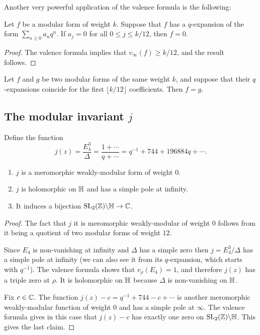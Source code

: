 Another very powerful application of the valence formula is the following:
\begin{theorem}
  Let $f$ be a modular form of weight $k$. Suppose that $f$ has a $q$-expansion of the form $\sum_{n\geq 0} a_nq^n$. If $a_j=0$ for all $0\leq j\leq k/12$, then $f=0$.
\end{theorem}
\begin{proof}
  The valence formula implies that $v_\infty(f)\geq k/12$, and the result follows.
\end{proof}
\begin{corollary}
  Let $f$ and $g$ be two modular forms of the same weight $k$, and suppose that their $q$-expansions coincide for the first $\lfloor k/12\rfloor$ coefficients. Then $f=g$.
\end{corollary}

\subsection{The modular invariant \texorpdfstring{$j$}{j}}
  Define the function
\[
j(z)=\frac{E_4^3}{\Delta} = \frac{1+\cdots}{q+\cdots} = q^{-1} + 744 + 196884 q + \cdots.
\]
\begin{proposition}
  \begin{enumerate}
  \item $j$ is a meromorphic weakly-modular form of weight $0$.
  \item $j$ is holomorphic on $\mathbb{H}$ and has a simple pole at infinity.
  \item It induces a bijection $\operatorname{SL}_2(\mathbb{Z})\backslash\mathbb{H}\to \mathbb{C}$.
  \end{enumerate}
\end{proposition}
\begin{proof}
The fact that $j$ it is meromorphic weakly-modular of weight $0$ follows from it being a quotient of two modular forms of weight $12$.

Since $E_4$ is non-vanishing at infinity and $\Delta$ has a simple zero then $j=E_4^3/\Delta$ has a simple pole at infinity (we can also see it from its $q$-expansion, which starts with $q^{-1}$). The valence formula shows that $v_\rho(E_4)=1$, and therefore $j(z)$ has a triple zero at $\rho$. It is holomorphic on $\mathbb{H}$ because $\Delta$ is non-vanishing on $\mathbb{H}$.

Fix $c\in\mathbb{C}$. The function $j(z)-c=q^{-1}+744-c+\cdots$ is another meromorphic weakly-modular function of weight $0$ and has a simple pole at $\infty$. The valence formula gives in this case that $j(z)-c$ has exactly one zero on $\operatorname{SL}_2(\mathbb{Z})\backslash\mathbb{H}$. This gives the last claim.
\end{proof}

